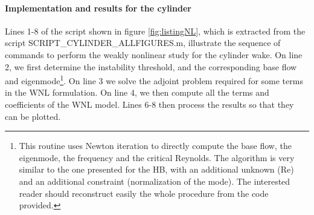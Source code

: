 \documentclass[twocolumn,10pt]{asme2ej}
\begin{document}


\paragraph{Implementation and results for the cylinder}




Lines 1-8 of the script shown in figure \ref{fig:listingNL}, which is extracted from the script 
{\sf SCRIPT\_CYLINDER\_ALLFIGURES.m}, illustrate the sequence of commands to 
perform the weakly nonlinear study for the cylinder wake.
On line 2, we first determine the instability threshold, and the corresponding base flow and eigenmode\footnote{This routine uses Newton iteration to directly compute the base flow, the eigenmode, the frequency and the critical Reynolds. The algorithm is very similar to the one presented for the HB, with an additional unknown (Re) and an additional constraint (normalization of the mode). The interested reader should reconstruct easily the whole procedure from the code provided.}. 
On line 3 we solve the adjoint problem required for some terms in the WNL formulation.
On line 4, we then compute all the terms and coefficients of the WNL model.
Lines 6-8 then process the results so that they can be plotted.

\end{document}
